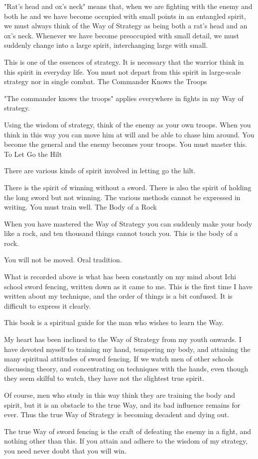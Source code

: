 "Rat's head and ox's neck" means that, when we are fighting with the enemy and both he and we have become occupied with small points in an entangled spirit, we must always think of the Way of Strategy as being both a rat's head and an ox's neck. Whenever we have become preoccupied with small detail, we must suddenly change into a large spirit, interchanging large with small.

This is one of the essences of strategy. It is necessary that the warrior think in this spirit in everyday life. You must not depart from this spirit in large-scale strategy nor in single combat.
The Commander Knows the Troops

"The commander knows the troops" applies everywhere in fights in my Way of strategy.

Using the wisdom of strategy, think of the enemy as your own troops. When you think in this way you can move him at will and be able to chase him around. You become the general and the enemy becomes your troops. You must master this.
To Let Go the Hilt

There are various kinds of spirit involved in letting go the hilt.

There is the spirit of winning without a sword. There is also the spirit of holding the long sword but not winning. The various methods cannot be expressed in writing. You must train well.
The Body of a Rock

When you have mastered the Way of Strategy you can suddenly make your body like a rock, and ten thousand things cannot touch you. This is the body of a rock.

You will not be moved. Oral tradition.

What is recorded above is what has been constantly on my mind about Ichi school sword fencing, written down as it came to me. This is the first time I have written about my technique, and the order of things is a bit confused. It is difficult to express it clearly.

This book is a spiritual guide for the man who wishes to learn the Way.

My heart has been inclined to the Way of Strategy from my youth onwards. I have devoted myself to training my hand, tempering my body, and attaining the many spiritual attitudes of sword fencing. If we watch men of other schools discussing theory, and concentrating on techniques with the hands, even though they seem skilful to watch, they have not the slightest true spirit.

Of course, men who study in this way think they are training the body and spirit, but it is an obstacle to the true Way, and its bad influence remains for ever. Thus the true Way of Strategy is becoming decadent and dying out.

The true Way of sword fencing is the craft of defeating the enemy in a fight, and nothing other than this. If you attain and adhere to the wisdom of my strategy, you need never doubt that you will win. 
